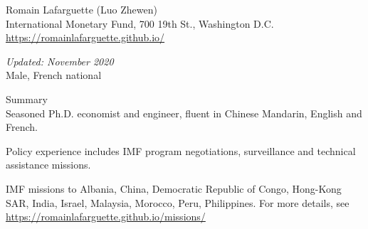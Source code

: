 \documentclass[usegeometry, 10pt, a4paper]{cv} %
\begin{document}
\hspace{15mm}
\begin{chapeau}
\begin{adresse}
\begin{flushleft}
    Romain Lafarguette (Luo Zhewen)\\
    International Monetary Fund, 700 19th St., Washington D.C.\\
    \url{https://romainlafarguette.github.io/} \\
\end{flushleft}
\end{adresse}
\begin{etatcivil}
\begin{flushleft}
  \emph{Updated: November 2020}\\
Male, French national
\end{flushleft}
\end{etatcivil}
\end{chapeau}


\begin{rubriquetableau}[0.95\textwidth]{Summary}\\
  \vspace{-0.3cm}
  \noindent Seasoned Ph.D. economist and engineer, fluent in Chinese Mandarin,
  English and French.\\

  \smallskip

\noindent Policy  experience includes  IMF  program negotiations,  surveillance  and  technical
assistance missions.\\

\smallskip

IMF missions to Albania, China, Democratic Republic of Congo, Hong-Kong  SAR,
India, Israel, Malaysia, Morocco, Peru,
Philippines. For more details, see \url{https://romainlafarguette.github.io/missions/} \\

\end{rubriquetableau}

\vspace{0.5cm}
\end{document}
